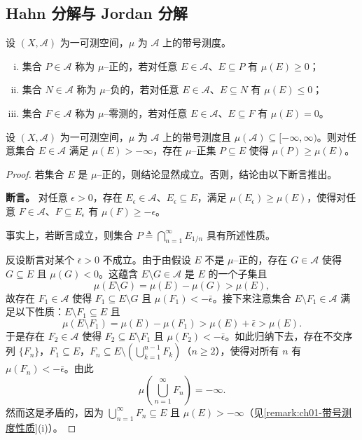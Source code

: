 \documentclass[../../main.tex]{subfiles}%
\begin{document}
\subsection{Hahn 分解与 Jordan 分解}\label{subsection:ch01-HahnJordan}

\begin{definition}\label{definition:ch01-正负集}
设 $(X,\mathcal{A})$ 为一可测空间，$\mu$ 为 $\mathcal{A}$ 上的带号测度。
\begin{enumerate}[(i)]
\item 集合 $P\in\mathcal{A}$ 称为 $\mu$--正的，若对任意 $E\in\mathcal{A}$、$E\subseteq P$ 有 $\mu(E)\geqslant 0$；
\item 集合 $N\in\mathcal{A}$ 称为 $\mu$--负的，若对任意 $E\in\mathcal{A}$、$E\subseteq N$ 有 $\mu(E)\leqslant 0$；
\item 集合 $F\in\mathcal{A}$ 称为 $\mu$--零测的，若对任意 $E\in\mathcal{A}$、$E\subseteq F$ 有 $\mu(E)=0$。
\end{enumerate}
\end{definition}

\begin{lemma}\label{lemma:ch01-正集子集}
设 $(X,\mathcal{A})$ 为一可测空间，$\mu$ 为 $\mathcal{A}$ 上的带号测度且 $\mu(\mathcal{A})\subseteq[-\infty,\infty)$。则对任意集合 $E\in\mathcal{A}$ 满足 $\mu(E)>-\infty$，存在 $\mu$--正集 $P\subseteq E$ 使得 $\mu(P)\geqslant\mu(E)$。
\end{lemma}

\begin{proof}
若集合 $E$ 是 $\mu$--正的，则结论显然成立。否则，结论由以下断言推出。

\textbf{断言。} 对任意 $\epsilon>0$，存在 $E_\epsilon\in\mathcal{A}$、$E_\epsilon\subseteq E$，满足 $\mu(E_\epsilon)\geqslant\mu(E)$，使得对任意 $F\in\mathcal{A}$、$F\subseteq E_\epsilon$ 有 $\mu(F)\geqslant-\epsilon$。

事实上，若断言成立，则集合 $P\triangleq \bigcap_{n=1}^\infty E_{1/n}$ 具有所述性质。

反设断言对某个 $\bar{\epsilon}>0$ 不成立。由于由假设 $E$ 不是 $\mu$--正的，存在 $G\in\mathcal{A}$ 使得 $G\subseteq E$ 且 $\mu(G)<0$。这蕴含 $E\setminus G\in\mathcal{A}$ 是 $E$ 的一个子集且
\[
\mu(E\setminus G)=\mu(E)-\mu(G)>\mu(E),
\]
故存在 $F_1\in\mathcal{A}$ 使得 $F_1\subseteq E\setminus G$ 且 $\mu(F_1)<-\bar{\epsilon}$。接下来注意集合 $E\setminus F_1\in\mathcal{A}$ 满足以下性质：$E\setminus F_1\subseteq E$ 且
\[
\mu(E\setminus F_1)=\mu(E)-\mu(F_1)>\mu(E)+\bar{\epsilon}>\mu(E).
\]
于是存在 $F_2\in\mathcal{A}$ 使得 $F_2\subseteq E\setminus F_1$ 且 $\mu(F_2)<-\bar{\epsilon}$。如此归纳下去，存在不交序列 $\{F_n\}$，$F_1\subseteq E$，$F_n\subseteq E\setminus\left(\bigcup_{k=1}^{n-1}F_k\right)$（$n\geqslant 2$），使得对所有 $n$ 有 $\mu(F_n)<-\bar{\epsilon}$。由此
\[
\mu\left(\bigcup_{n=1}^\infty F_n\right)=-\infty.
\]
然而这是矛盾的，因为 $\bigcup_{n=1}^\infty F_n\subseteq E$ 且 $\mu(E)>-\infty$（见\cref{remark:ch01-带号测度性质}(i)）。
\end{proof}
\end{document}
